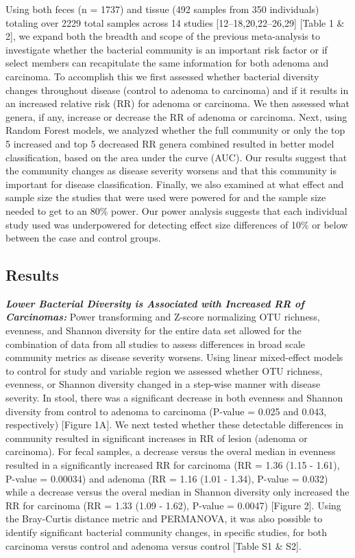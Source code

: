 \documentclass[12pt,]{article}
\begin{document}
Using both feces (n = 1737) and tissue (492 samples from 350
individuals) totaling over 2229 total samples across 14 studies
{[}12--18,20,22--26,29{]} {[}Table 1 \& 2{]}, we expand both the breadth
and scope of the previous meta-analysis to investigate whether the
bacterial community is an important risk factor or if select members can
recapitulate the same information for both adenoma and carcinoma. To
accomplish this we first assessed whether bacterial diversity changes
throughout disease (control to adenoma to carcinoma) and if it results
in an increased relative risk (RR) for adenoma or carcinoma. We then
assessed what genera, if any, increase or decrease the RR of adenoma or
carcinoma. Next, using Random Forest models, we analyzed whether the
full community or only the top 5 increased and top 5 decreased RR genera
combined resulted in better model classification, based on the area
under the curve (AUC). Our results suggest that the community changes as
disease severity worsens and that this community is important for
disease classification. Finally, we also examined at what effect and
sample size the studies that were used were powered for and the sample
size needed to get to an 80\% power. Our power analysis suggests that
each individual study used was underpowered for detecting effect size
differences of 10\% or below between the case and control groups.

\newpage

\subsection{Results}\label{results}

\textbf{\emph{Lower Bacterial Diversity is Associated with Increased RR
of Carcinomas:}} Power transforming and Z-score normalizing OTU
richness, evenness, and Shannon diversity for the entire data set
allowed for the combination of data from all studies to assess
differences in broad scale community metrics as disease severity
worsens. Using linear mixed-effect models to control for study and
variable region we assessed whether OTU richness, evenness, or Shannon
diversity changed in a step-wise manner with disease severity. In stool,
there was a significant decrease in both evenness and Shannon diversity
from control to adenoma to carcinoma (P-value = 0.025 and 0.043,
respectively) {[}Figure 1A{]}. We next tested whether these detectable
differences in community resulted in significant increases in RR of
lesion (adenoma or carcinoma). For fecal samples, a decrease versus the
overal median in evenness resulted in a significantly increased RR for
carcinoma (RR = 1.36 (1.15 - 1.61), P-value = 0.00034) and adenoma (RR =
1.16 (1.01 - 1.34), P-value = 0.032) while a decrease versus the overal
median in Shannon diversity only increased the RR for carcinoma (RR =
1.33 (1.09 - 1.62), P-value = 0.0047) {[}Figure 2{]}. Using the
Bray-Curtis distance metric and PERMANOVA, it was also possible to
identify significant bacterial community changes, in specific studies,
for both carcinoma versus control and adenoma versus control {[}Table S1
\& S2{]}.
\end{document}
